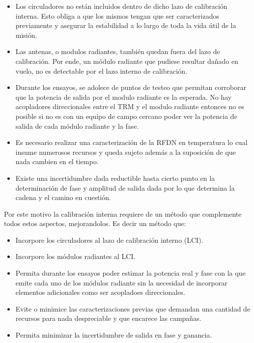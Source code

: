 \documentclass[a4paper,10pt]{article}
\begin{document}
\begin{itemize}
    \item Los circuladores no están incluidos dentro de dicho lazo de 
calibración interna. Esto obliga a que los mismos tengan que ser caracterizados
previamente y asegurar la estabilidad a lo largo de toda la vida útil de la
misión.
    \item Las antenas, o modulos radiantes, también quedan fuera del lazo de
calibración. Por ende, un módulo radiante que pudiese resultar dañado en vuelo,
no es detectable por el lazo interno de calibración.
    \item Durante los ensayos, se adolece de puntos de testeo que permitan 
corroborar que la potencia de salida por el modulo radiante es la esperada. No
hay acopladores direccionales entre el TRM y el modulo radiante entonces no es
posible si no es con un equipo de campo cercano poder ver la potencia de salida
de cada módulo radiante y la fase.
    \item Es necesario realizar una caracterización de la RFDN en temperatura lo
cual insume numerosos recursos y queda sujeto además a la suposición de que nada
cambien en el tiempo.
    \item Existe una incertidumbre dada reductible hasta cierto punto en la 
determinación de fase y amplitud de salida dada por lo que determina la cadena y
el camino en cuestión.
\end{itemize}

Por este motivo la calibración interna requiere de un método que complemente 
todos estos aspectos, mejorandolos. Es decir un método que:

\begin{itemize}
    \item Incorpore los circuladores al lazo de calibración interno (LCI).
    \item Incorpore los módulos radiantes al LCI.
    \item Permita durante los ensayos poder estimar la potencia real y fase con
la que emite cada uno de los módulos radiante sin la necesidad de incorporar
elementos adicionales como ser acopladoes direccionales.
    \item Evite o minimice las caracterizaciones previas que demandan una
cantidad de recursos para nada despreciable y que encarece las campañas.
    \item Permita minimizar la incertidumbre de salida en fase y ganancia.
\end{itemize}
\end{document}
